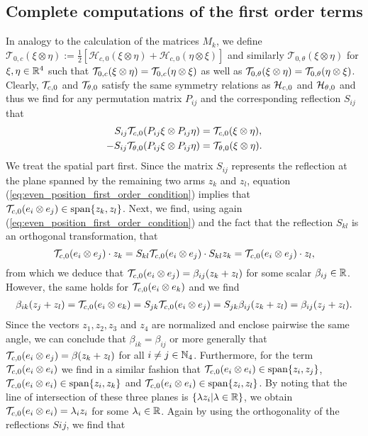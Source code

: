 \subsection{Complete computations of the first order terms}
 
 In analogy to the calculation of the matrices $M_k$, we define $\mathcal{T}_{0, c}(\xi \otimes \eta) := \tfrac{1}{2}  [\mathcal{H}_{c,0}(\xi \otimes \eta) + \mathcal{H}_{c,0}(\eta \otimes \xi)]$ and similarly $\mathcal{T}_{0, \theta}(\xi \otimes \eta)$ for $\xi, \eta \in \mathbb{R}^4$ such that $\mathcal{T}_{0,c}(\xi \otimes \eta) = \mathcal{T}_{0,c}(\eta \otimes \xi)$ as well as $\mathcal{T}_{0,\theta}(\xi \otimes \eta) = \mathcal{T}_{0,\theta}(\eta \otimes \xi)$. Clearly, $\mathcal{T}_{c,0}$ and $\mathcal{T}_{\theta,0}$ satisfy the same symmetry relations as $\mathcal{H}_{c,0}$ and $\mathcal{H}_{\theta,0}$ and thus we find for any permutation matrix $P_{ij}$ and the corresponding reflection $S_{ij}$ that
\begin{align}
\label{eq:even_position_first_order_condition}
 S_{ij}\mathcal{T}_{c,0}(P_{ij} \xi \otimes P_{ij} \eta) &= \mathcal{T}_{c,0}(\xi \otimes \eta),\\
 \label{eq:even_angle_first_order_condition}
  -S_{ij}\mathcal{T}_{\theta,0}(P_{ij} \xi \otimes P_{ij} \eta) &= \mathcal{T}_{\theta,0}(\xi \otimes \eta).
\end{align}
We treat the spatial part first. Since the matrix $S_{ij}$ represents the reflection at the plane spanned by the remaining two arms $z_k$ and $z_l$, equation (\ref{eq:even_position_first_order_condition}) implies that $\mathcal{T}_{c,0}(e_i \otimes e_j) \in \operatorname{span}\{z_k, z_l\}$. Next, we find, using again (\ref{eq:even_position_first_order_condition}) and the fact that the reflection $S_{kl}$ is an orthogonal transformation, that
\begin{equation}
\mathcal{T}_{c,0}(e_i \otimes e_j) \cdot z_k = S_{kl}\mathcal{T}_{c,0}(e_i \otimes e_j) \cdot S_{kl} z_k = \mathcal{T}_{c,0}(e_i \otimes e_j) \cdot z_l,
\end{equation}
from which we deduce that $\mathcal{T}_{c,0}(e_i \otimes e_j) = \beta_{ij} (z_k + z_l)$ for some scalar $\beta_{ij} \in \mathbb{R}$. However, the same holds for $\mathcal{T}_{c,0}(e_i \otimes e_k)$ and we find
\begin{align}
\beta_{ik} (z_j + z_l) = \mathcal{T}_{c,0}(e_i \otimes e_k) = S_{jk} \mathcal{T}_{c,0}(e_i \otimes e_j) = S_{jk} \beta_{ij} (z_k + z_l) = \beta_{ij} (z_j + z_l).
\end{align}
Since the vectors $z_1, z_2, z_3$ and $z_4$ are normalized and enclose pairwise the same angle, we can conclude that $\beta_{ik} = \beta_{ij}$ or more generally that $\mathcal{T}_{c,0}(e_i \otimes e_j) = \beta (z_k + z_l)$ for all $i \neq j \in \mathbb{N}_4$. Furthermore, for the term $\mathcal{T}_{c,0}(e_i \otimes e_i)$ we find in a similar fashion that $\mathcal{T}_{c,0}(e_i \otimes e_i) \in \operatorname{span}\{z_i, z_j\}$, $\mathcal{T}_{c,0}(e_i \otimes e_i) \in \operatorname{span}\{z_i, z_k\}$ and $\mathcal{T}_{c,0}(e_i \otimes e_i) \in \operatorname{span}\{z_i, z_l\}$. By noting that the line of intersection of these three planes is $\{\lambda z_i | \lambda \in\mathbb{R}\}$, we obtain $\mathcal{T}_{c,0}(e_i \otimes e_i) = \lambda_i z_i$ for some $\lambda_i \in \mathbb{R}$. Again by using the orthogonality of the reflections $Sij$, we find that
